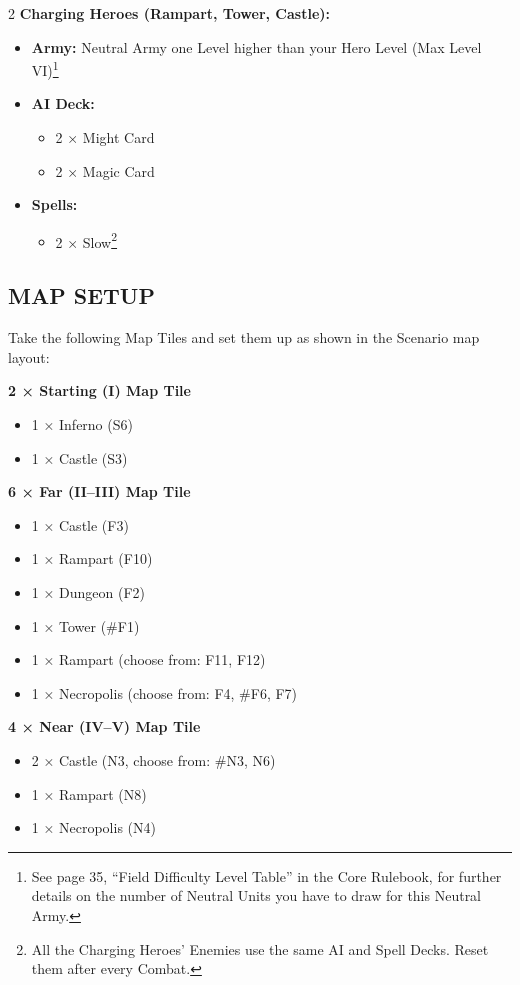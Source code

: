 \begin{multicols*}{2}
\textbf{Charging Heroes (Rampart, Tower, Castle):}
\begin{itemize}
    \item \textbf{Army:}
       Neutral Army one Level higher than your Hero Level (Max Level VI)\footnote{See page 35, ``Field Difficulty Level Table'' in the Core Rulebook, for further details on the number of Neutral Units you have to draw for this Neutral Army.}
    \item \textbf{AI Deck:}
    \begin{itemize}
        \item 2 ×  Might Card
        \item 2 ×  Magic Card
    \end{itemize}
    \item \textbf{Spells:}
    \begin{itemize}
        \item 2 × Slow\footnote{All the Charging Heroes' Enemies use the same AI and Spell Decks. Reset them after every Combat.}
    \end{itemize}
\end{itemize}

\subsection*{\MakeUppercase{Map Setup}}

Take the following Map Tiles and set them up as shown in the Scenario map layout:

\textbf{2 × Starting (I) Map Tile}
\begin{itemize}
  \item 1 × Inferno (S6)
  \item 1 × Castle (S3)
\end{itemize}

\textbf{6 × Far (II--III) Map Tile}
\begin{itemize}
  \item 1 × Castle (F3)
  \item 1 × Rampart (F10)
  \item 1 × Dungeon (F2)
  \item 1 × Tower (\#F1)
  \item 1 × Rampart (choose from: F11, F12)
  \item 1 × Necropolis (choose from: F4, \#F6, F7)
\end{itemize}

\textbf{4 × Near (IV--V) Map Tile}
\begin{itemize}
  \item 2 × Castle (N3, choose from: \#N3, N6)
  \item 1 × Rampart (N8)
  \item 1 × Necropolis (N4)
\end{itemize}


\end{multicols*}
